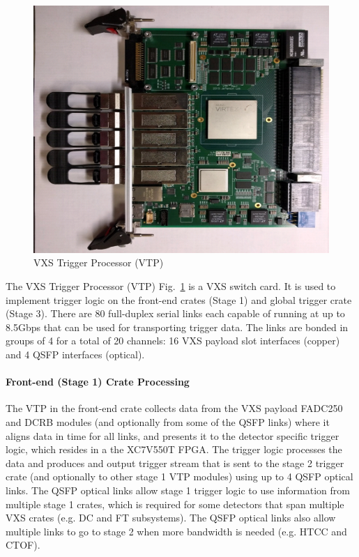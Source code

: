 \begin{figure}[hbt]
	\centering
	\includegraphics[width=1.0\columnwidth,keepaspectratio]{img/vtp_board.png}
	\caption{VXS Trigger Processor (VTP)}
	\label{fig:vtp_board}
\end{figure}

The VXS Trigger Processor (VTP) Fig.~\ref{fig:vtp_board} is a VXS switch card. It is used to implement trigger logic on the front-end crates (Stage 1) and global trigger crate (Stage 3). There are 80 full-duplex serial links each capable of running at up to 8.5Gbps that can be used for transporting trigger data. The links are bonded in groups of 4 for a total of 20 channels: 16 VXS payload slot interfaces (copper) and 4 QSFP interfaces (optical).

\paragraph{Front-end (Stage 1) Crate Processing}
The VTP in the front-end crate collects data from the VXS payload FADC250 and DCRB modules (and optionally from some of the QSFP links) where it aligns data in time for all links, and presents it to the detector specific trigger logic, which resides in a the XC7V550T FPGA. The trigger logic processes the data and produces and output trigger stream that is sent to the stage 2 trigger crate (and optionally to other stage 1 VTP modules) using up to 4 QSFP optical links. The QSFP optical links allow stage 1 trigger logic to use information from multiple stage 1 crates, which is required for some detectors that span multiple VXS crates (e.g. DC and FT subsystems). The QSFP optical links also allow multiple links to go to stage 2 when more bandwidth is needed (e.g. HTCC and CTOF).

